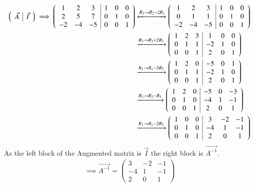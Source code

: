 \documentclass[journal]{IEEEtran}
\begin{document}
    \begin{align}
\left(\begin{array}{c|c}
        \Vec{A} & \Vec{I}
\end{array}\right)
\implies 
\left(\begin{array}{ccc|ccc}
        1 & 2 & 3 & 1 & 0 & 0\\
        2 & 5 & 7 &  0 & 1 & 0\\
        -2 & -4 & -5 & 0 & 0 &1
\end{array}\right) &\xleftrightarrow{R_2 \rightarrow R_2-2R_1}  \left(\begin{array}{ccc|ccc}
        1 & 2 & 3 & 1 & 0 & 0\\
        0 & 1 & 1 &  0 & 1 & 0\\
        -2 & -4 & -5 & 0 & 0 &1
\end{array}\right)\\
&\xrightarrow{R_3 \rightarrow R_3+2R_1} \left(\begin{array}{ccc|ccc}
        1 & 2 & 3 & 1 & 0 & 0\\
        0 & 1 & 1 &  -2 & 1 & 0\\
        0 & 0 & 1 & 2 & 0 &1
\end{array}\right)\\
&\xrightarrow{R_1 \rightarrow R_1-3R_3} \left(\begin{array}{ccc|ccc}
        1 & 2 & 0 & -5 & 0 & 1\\
        0 & 1 & 1 &  -2 & 1 & 0\\
        0 & 0 & 1 & 2 & 0 &1
\end{array}\right)\\
&\xrightarrow{R_2 \rightarrow R_2-R_3} \left(\begin{array}{ccc|ccc}
        1 & 2 & 0 & -5 & 0 & -3\\
        0 & 1 & 0 &  -4 & 1 & -1\\
        0 & 0 & 1 & 2 & 0 &1
\end{array}\right)\\
&\xrightarrow{R_1 \rightarrow R_1-2R_2} \left(\begin{array}{ccc|ccc}
        1 & 0 & 0 & 3 & -2 & -1\\
        0 & 1 & 0 &  -4 & 1 & -1\\
        0 & 0 & 1 & 2 & 0 &1
\end{array}\right)
\end{align}
As the left block of the Augmented matrix is $\Vec{I}$ the right block is $\Vec{A^{-1}}$.
\begin{align}
   \implies \Vec{A^{-1}}=\begin{pmatrix}
        3 & -2 & -1\\
        -4 & 1 & -1\\
        2 & 0 &1
    \end{pmatrix}
\end{align}
\end{document}

